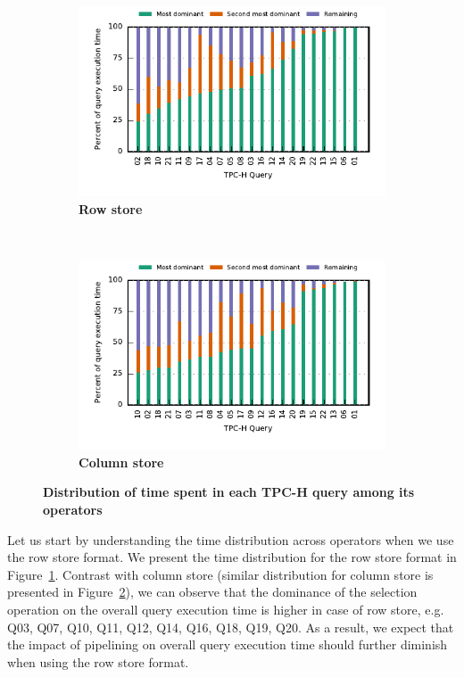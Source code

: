 \begin{figure}[ht]
	\centering
	\begin{subfigure}[ht]{0.48\textwidth}
		\includegraphics{pipeline/figures/all-tpch-queries-time-distribution-rowstore}
		\caption{\textbf{Row store}}
		\label{fig:time-distribution-all-tpch-rowstore}
	\end{subfigure}
	~
	\begin{subfigure}[ht]{0.48\textwidth}
		\includegraphics{pipeline/figures/all-tpch-queries-time-distribution-withlip}
		\caption{\textbf{Column store}}
		\label{fig:time-distribution-all-tpch-colstore}
	\end{subfigure}
	\caption{\textbf{Distribution of time spent in each TPC-H query among its operators}}
	\label{fig:tpch-operator-time-distribution}
\end{figure}


Let us start by understanding the time distribution across operators when we use the row store format.
We present the time distribution for the row store format in Figure~\ref{fig:time-distribution-all-tpch-rowstore}.
Contrast with column store (similar distribution for column store is presented in Figure~\ref{fig:time-distribution-all-tpch-colstore}), we can observe that the dominance of the selection operation on the overall query execution time is higher in case of row store, e.g. Q03, Q07, Q10, Q11, Q12, Q14, Q16, Q18, Q19, Q20.
As a result, we expect that the impact of pipelining on overall query execution time should further diminish when using the row store format.

